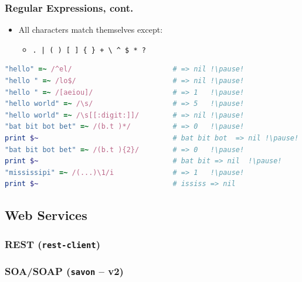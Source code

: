 \begin{frame}[fragile]\frametitle{Regular Expressions, cont.}

\begin{itemize}

\item All characters match themselves except:

\begin{itemize}
\item \lstinline!. | ( ) [ ] { } + \ ^ $ * ?!
\end{itemize}

\end{itemize}

\pause

\begin{lstlisting}[language=ruby, escapechar={!}]
"hello" =~ /^el/                        # => nil !\pause!
"hello " =~ /lo$/                       # => nil !\pause!
"hello " =~ /[aeiou]/                   # => 1   !\pause!
"hello world" =~ /\s/                   # => 5   !\pause!
"hello world" =~ /\s[[:digit:]]/        # => nil !\pause!
"bat bit bot bet" =~ /(b.t )*/          # => 0   !\pause!
print $~                                # bat bit bot  => nil !\pause!
"bat bit bot bet" =~ /(b.t ){2}/        # => 0   !\pause!
print $~                                # bat bit => nil  !\pause!
"mississipi" =~ /(...)\1/i              # => 1   !\pause!
print $~                                # ississ => nil 
\end{lstlisting}

\end{frame}





\subsection{Web Services}
\begin{frame}[fragile]\frametitle{REST (\texttt{rest-client})}

\end{frame}



\begin{frame}[fragile]\frametitle{SOA/SOAP (\texttt{savon} -- v2)}

\end{frame}





